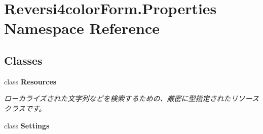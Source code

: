 \hypertarget{namespace_reversi4color_form_1_1_properties}{}\section{Reversi4color\+Form.\+Properties Namespace Reference}
\label{namespace_reversi4color_form_1_1_properties}
\subsection*{Classes}
\begin{DoxyCompactItemize}
\item 
class {\bfseries Resources}
\begin{DoxyCompactList}\small\item\em ローカライズされた文字列などを検索するための、厳密に型指定されたリソース クラスです。 \end{DoxyCompactList}\item 
class {\bfseries Settings}
\end{DoxyCompactItemize}

